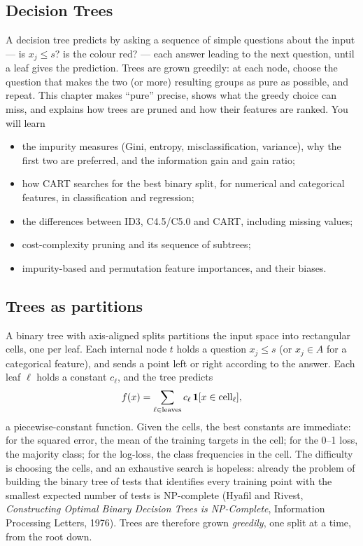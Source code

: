 \begin{notechapter}
\chapter{Decision Trees}\label{ch:decision-trees}

\begin{chapterintro}
A decision tree predicts by asking a sequence of simple questions about the input
--- is $x_j\leq s$? is the colour red? --- each answer leading to the next question, until a
leaf gives the prediction. Trees are grown greedily: at each node, choose the question
that makes the two (or more) resulting groups as pure as possible, and repeat. This
chapter makes ``pure'' precise, shows what the greedy choice can miss, and explains
how trees are pruned and how their features are ranked. You will learn
\begin{itemize}[nosep]
  \item the impurity measures (Gini, entropy, misclassification, variance), why the first
        two are preferred, and the information gain and gain ratio;
  \item how CART searches for the best binary split, for numerical and categorical
        features, in classification and regression;
  \item the differences between ID3, C4.5/C5.0 and CART, including missing values;
  \item cost-complexity pruning and its sequence of subtrees;
  \item impurity-based and permutation feature importances, and their biases.
\end{itemize}
\end{chapterintro}

\section{Trees as partitions}\label{decision-trees:sec:partition}

A binary tree with axis-aligned splits partitions the input space into rectangular cells,
one per leaf. Each internal node $t$ holds a question $x_j\leq s$ (or $x_j\in A$ for a categorical
feature), and sends a point left or right according to the answer. Each leaf $\ell$ holds a
constant $c_\ell$, and the tree predicts
\[
  f(x) = \sum_{\ell\in\text{leaves}}c_\ell\,\mathbf{1}[x\in\text{cell}_\ell],
\]
a piecewise-constant function. Given the cells, the best constants are immediate: for the
squared error, the mean of the training targets in the cell; for the 0--1 loss, the
majority class; for the log-loss, the class frequencies in the cell. The difficulty is
choosing the cells, and an exhaustive search is hopeless: already the problem of building
the binary tree of tests that identifies every training point with the smallest expected
number of tests is NP-complete (Hyafil and Rivest, \emph{Constructing Optimal Binary
Decision Trees is NP-Complete}, Information Processing Letters, 1976). Trees are therefore grown \emph{greedily}, one split at
a time, from the root down.


\end{notechapter}
